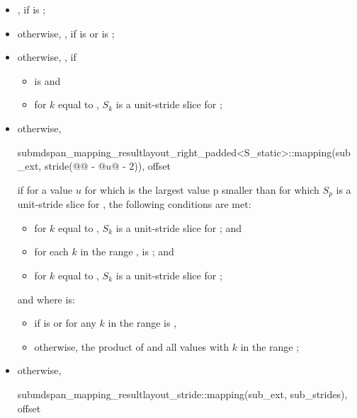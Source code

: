 \begin{itemdescr}
\pnum
\returns
\begin{itemize}
\item
{},
if  is ;
\item
otherwise,
,\newline
if  is  or
 is ;
\item
otherwise,
,
if
\begin{itemize}
\item
{} is  and
\item
for $k$ equal to ,
$S_k$ is a unit-stride slice for ;
\end{itemize}
\item
otherwise,
\begin{codeblock}
submdspan_mapping_result{layout_right_padded<S_static>::mapping(sub_ext,
                             stride(@@ - @$u$@ - 2)), offset}
\end{codeblock}
if for a value $u$
for which 
is the largest value p smaller than 
for which $S_p$ is a unit-stride slice for ,
the following conditions are met:
\begin{itemize}
\item
for $k$ equal to ,
$S_k$ is a unit-stride slice for ; and
\item
for each $k$ in the range
,
 is ; and
\item
for $k$ equal to ,\newline
$S_k$ is a unit-stride slice for ;
\end{itemize}
and where  is:
\begin{itemize}
\item
{}
if  is  or
for any $k$ in the range 
 is ,
\item
otherwise, the product of  and
all values 
with $k$ in the range ;
\end{itemize}
\item
otherwise,
\begin{codeblock}
submdspan_mapping_result{layout_stride::mapping(sub_ext, sub_strides), offset}
\end{codeblock}
\end{itemize}
\end{itemdescr}

